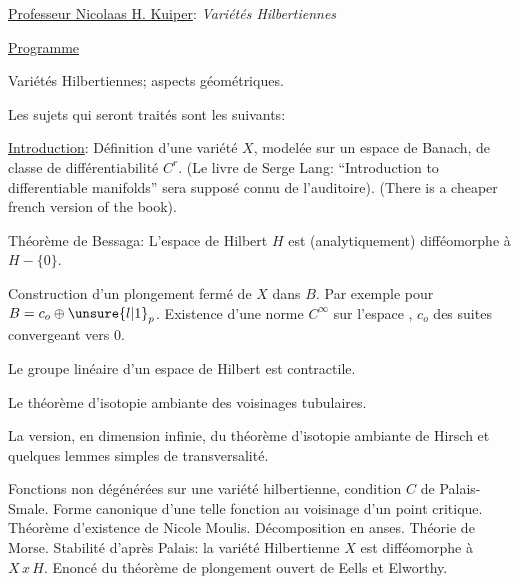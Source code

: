 \uline{Professeur Nicolaas H. Kuiper}: \textit{Variétés Hilbertiennes}

\uline{Programme}

Variétés Hilbertiennes; aspects géométriques.

Les sujets qui seront traités sont les suivants:

\uline{Introduction}: Définition d'une variété $X$, modelée sur un espace de Banach, de classe de différentiabilité $C^r$. (Le livre de Serge Lang: ``Introduction to differentiable manifolds'' sera supposé connu de l'auditoire). (There is a cheaper french version of the book).

Théorème de Bessaga: L'espace de Hilbert $H$ est (analytiquement) difféomorphe à $H-\{0\}$.

Construction d'un plongement fermé de $X$ dans $B$. Par exemple pour $B=c_o\oplus\unsure{l|1}_p$. Existence d'une norme $C^\infty$ sur l'espace , $c_o$ des suites convergeant vers $0$.

Le groupe linéaire d'un espace de Hilbert est contractile.

Le théorème d'isotopie ambiante des voisinages tubulaires.

La version, en dimension infinie, du théorème d'isotopie ambiante de Hirsch et quelques lemmes simples de transversalité.

Fonctions non dégénérées sur une variété hilbertienne, condition $C$ de Palais-Smale. Forme canonique d'une telle fonction au voisinage d'un point critique. Théorème d'existence de Nicole Moulis. Décomposition en anses. Théorie de Morse. Stabilité d'après Palais: la variété Hilbertienne $X$ est difféomorphe à $X\,x\,H$. Enoncé du théorème de plongement ouvert de Eells et Elworthy.

\margin{$\ldots/$}
